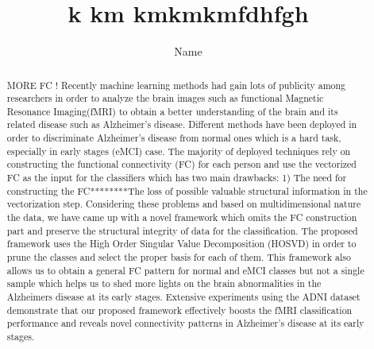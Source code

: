 \documentclass[preprint,12pt]{elsarticle}
\begin{document}
\begin{frontmatter}


 \title{k km kmkmkm}
 \tnotetext[label1]{}
 \author{Name}
 \fntext[label2]{}
 \cortext[cor1]{}
 \address{Address}
 \fntext[label3]{}

\title{fdhfgh}


\author{}

\address{}

\begin{abstract}

MORE FC !
Recently machine learning methods had gain lots of publicity among researchers in order to analyze the brain images such as functional Magnetic Resonance Imaging(fMRI) to obtain a better understanding of the brain and its related disease such as Alzheimer's disease. Different methods have been deployed in order to discriminate Alzheimer's disease from normal ones which is a hard task, especially in early stages (eMCI) case. The majority of deployed techniques rely on constructing the functional connectivity (FC) for each person and use the vectorized FC as the input for the classifiers which has two main drawbacks: 1) The need for constructing the FC********The loss of possible valuable structural information in the vectorization step.
    Considering these problems and based on multidimensional nature the data, we have came up with a novel framework which omits the FC construction part and preserve the structural integrity of data for the classification.
        The proposed framework uses the High Order Singular Value Decomposition (HOSVD) in order to prune the classes and select the proper basis for each of them.
This framework also allows us to obtain a general FC pattern for normal and eMCI classes but not a single sample which helps us to shed more lights on the brain abnormalities in the Alzheimers disease at its early stages. 
        Extensive experiments using the ADNI dataset demonstrate that
        our proposed framework effectively boosts the fMRI classification performance and reveals novel connectivity patterns in Alzheimer's disease at its early stages.
\end{abstract}


\end{frontmatter}
\end{document}
